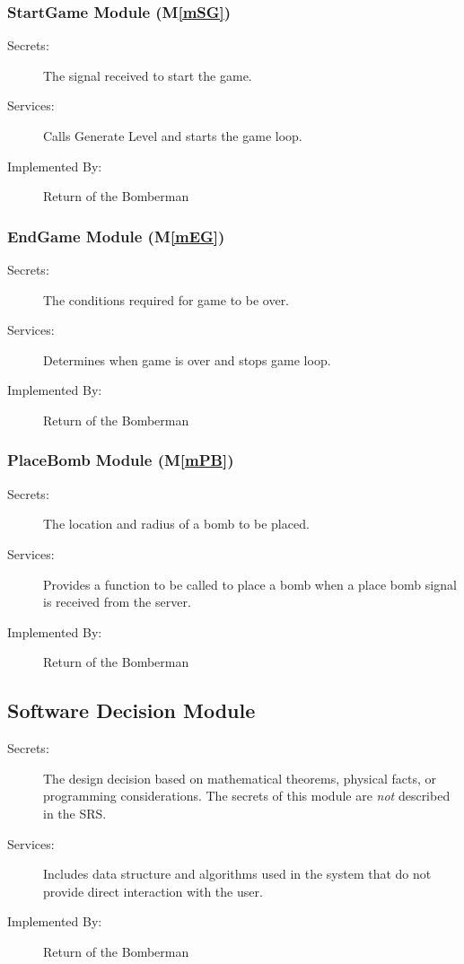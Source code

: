 \documentclass[12pt, titlepage]{article}
\newcommand{\mref}[1]{M\ref{#1}}
\begin{document}
\subsubsection{StartGame Module (\mref{mSG})}

\begin{description}
\item[Secrets:]The signal received to start the game.
\item[Services:]Calls Generate Level and starts the game loop.
\item[Implemented By:] Return of the Bomberman
\end{description}

\subsubsection{EndGame Module (\mref{mEG})}

\begin{description}
\item[Secrets:]The conditions required for game to be over.
\item[Services:]Determines when game is over and stops game loop.
\item[Implemented By:] Return of the Bomberman
\end{description}



\subsubsection{PlaceBomb Module (\mref{mPB})}

\begin{description}
\item[Secrets:]The location and radius of a bomb to be placed.
\item[Services:] Provides a function to be called to place a bomb when a place bomb signal is received from the server.
\item[Implemented By:] Return of the Bomberman
\end{description}


\subsection{Software Decision Module}

\begin{description}
\item[Secrets:] The design decision based on mathematical theorems, physical
  facts, or programming considerations. The secrets of this module are
  \emph{not} described in the SRS.
\item[Services:] Includes data structure and algorithms used in the system that
  do not provide direct interaction with the user. 
\item[Implemented By:] Return of the Bomberman
\end{description}
\end{document}
